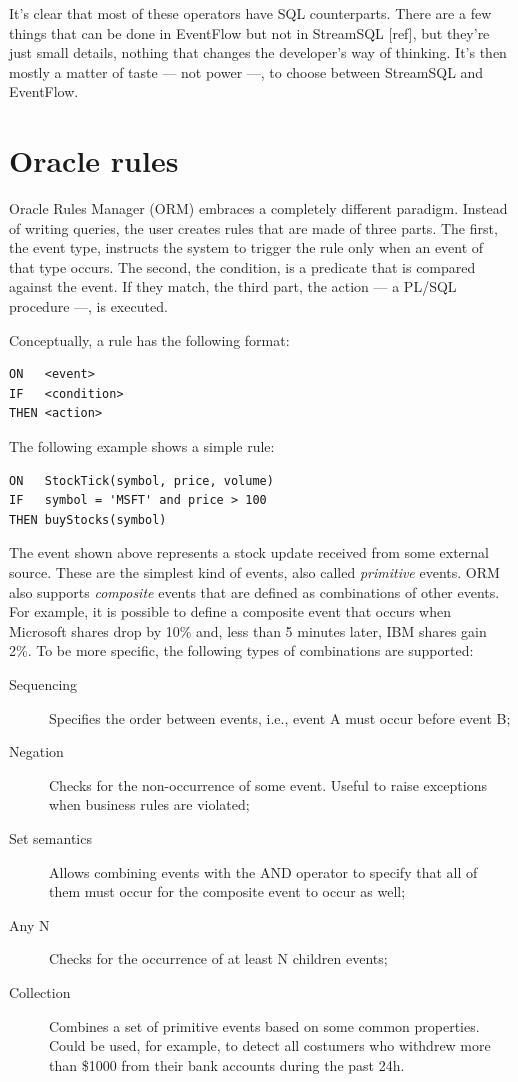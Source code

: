 \documentclass{report}
\begin{document}
It's clear that most of these operators have SQL counterparts. There
are a few things that can be done in EventFlow but not in StreamSQL
[ref], but they're just small details, nothing that changes the
developer's way of thinking. It's then mostly a matter of taste ---
not power ---, to choose between StreamSQL and EventFlow.

\section{Oracle rules}
\label{sec:orm}

Oracle Rules Manager (ORM) embraces a completely different
paradigm. Instead of writing queries, the user creates rules that are
made of three parts. The first, the event type, instructs the system
to trigger the rule only when an event of that type occurs. The
second, the condition, is a predicate that is compared against the
event. If they match, the third part, the action --- a PL/SQL
procedure ---, is executed.

Conceptually, a rule has the following format:

\begin{verbatim}
ON   <event>
IF   <condition>
THEN <action>
\end{verbatim}

The following example shows a simple rule:

\begin{verbatim}
ON   StockTick(symbol, price, volume)
IF   symbol = 'MSFT' and price > 100
THEN buyStocks(symbol)
\end{verbatim}

The event shown above represents a stock update received from some
external source. These are the simplest kind of events, also called
\emph{primitive} events. ORM also supports \emph{composite} events
that are defined as combinations of other events. For example, it is
possible to define a composite event that occurs when Microsoft shares
drop by 10\% and, less than 5 minutes later, IBM shares gain 2\%. To
be more specific, the following types of combinations are supported:
\begin{description}
\item [Sequencing] Specifies the order between events, i.e., event A
  must occur before event B;
\item [Negation] Checks for the non-occurrence of some event. Useful
  to raise exceptions when business rules are violated;
\item [Set semantics] Allows combining events with the AND operator to
  specify that all of them must occur for the composite event to occur
  as well;
\item [Any N] Checks for the occurrence of at least N children events;
\item [Collection] Combines a set of primitive events based on some
  common properties. Could be used, for example, to detect all
  costumers who withdrew more than \$1000 from their bank accounts
  during the past 24h.
\end{description}
\end{document}
